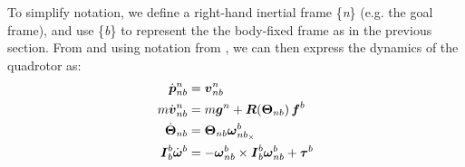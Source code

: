 To simplify notation, we define a right-hand inertial frame \{\textit{n}\} (e.g. the goal frame), and use \{\textit{b}\} to represent the the body-fixed frame as in the previous section. From \cite{MultirotorAerialVehicles} and using notation from \cite{Fossen2021}, we can then express the dynamics of the quadrotor as:
\begin{align}
    \Dot{{\boldsymbol{p}}}^n_{nb} &= {\boldsymbol{v}}^n_{nb} \\
    m \Dot{{\boldsymbol{v}}}^n_{nb} &= m\boldsymbol{g}^n + \boldsymbol{R} (\boldsymbol{\Theta}_{nb}) \, \boldsymbol{f}^b \label{4_1_transKinetics} \\ 
    \Dot{\boldsymbol{\Theta}}_{nb} &= \boldsymbol{\Theta}_{nb} \boldsymbol{\omega}^b_{nb_\times} \\
    \boldsymbol{I}^b_b\Dot{\boldsymbol{\omega}}^b &= - \boldsymbol{\omega}^b_{nb} \times \boldsymbol{I}^b_b\boldsymbol{\omega}^b_{nb} + \boldsymbol{\tau}^b  \label{4_1_rotKinetics}
\end{align}
